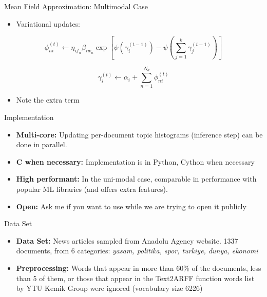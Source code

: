 \documentclass[pdf]{beamer}
\begin{document}
\begin{frame}{Mean Field Approximation: Multimodal Case}
	\begin{itemize}
		\item Variational updates:
	\end{itemize}
	\begin{equation*}
		\phi_{ni}^{(t)} \gets \eta_{i f_n} \beta_{i w_n} \exp\left[\psi\left(\gamma_{i}^{(t-1)}\right) - \psi\left({\sum_{j=1}^k \gamma_j^{(t-1)}}\right)\right]
	\end{equation*}
	
	\begin{equation*}
		\gamma_i^{(t)}\gets \alpha_i + \sum_{n=1}^{N_d} \phi_{ni}^{(t)}
	\end{equation*}
	\begin{itemize}
		\item Note the extra term
	\end{itemize}

\end{frame}

\begin{frame}{Implementation}
	\begin{itemize}
		\item {\bf Multi-core:} Updating per-document topic histograms (inference step) can be done in parallel. 
		\item {\bf C when necessary:} Implementation is in Python, Cython when necessary
		\item {\bf High performant:} In the uni-modal case, comparable in performance with popular ML libraries (and offers extra features).
		\item {\bf Open:} Ask me if you want to use while we are trying to open it publicly
	\end{itemize}
\end{frame}


\begin{frame}{Data Set}
	
	\begin{itemize}
		\item {\bf Data Set:} News articles sampled from Anadolu Agency website. 1337 documents, from 6 categories: \textit{yasam, politika, spor, turkiye, dunya, ekonomi}
		\item {\bf Preprocessing:} Words that appear in more than 60\% of the documents, less than 5 of them, or those that appear in the Text2ARFF function words list by YTU Kemik Group were ignored (vocabulary size 6226)
	\end{itemize}
	
\end{frame}
\end{document}
